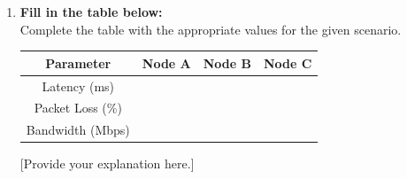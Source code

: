 \documentclass[a4paper,12pt]{article}
\begin{document}
\begin{enumerate}
    \item \textbf{Fill in the table below:} \\
    Complete the table with the appropriate values for the given scenario.

    \vspace{0.5cm}
    \begin{center}
        \begin{tabular}{|c|c|c|c|}
            \hline
            Parameter & Node A & Node B & Node C \\ \hline
            Latency (ms) & \underline{\hspace{2cm}} & \underline{\hspace{2cm}} & \underline{\hspace{2cm}} \\ \hline
            Packet Loss (\%) & \underline{\hspace{2cm}} & \underline{\hspace{2cm}} & \underline{\hspace{2cm}} \\ \hline
            Bandwidth (Mbps) & \underline{\hspace{2cm}} & \underline{\hspace{2cm}} & \underline{\hspace{2cm}} \\ \hline
        \end{tabular}
    \end{center}
    \vspace{0.5cm}
    [Provide your explanation here.]

\end{enumerate}
\end{document}

